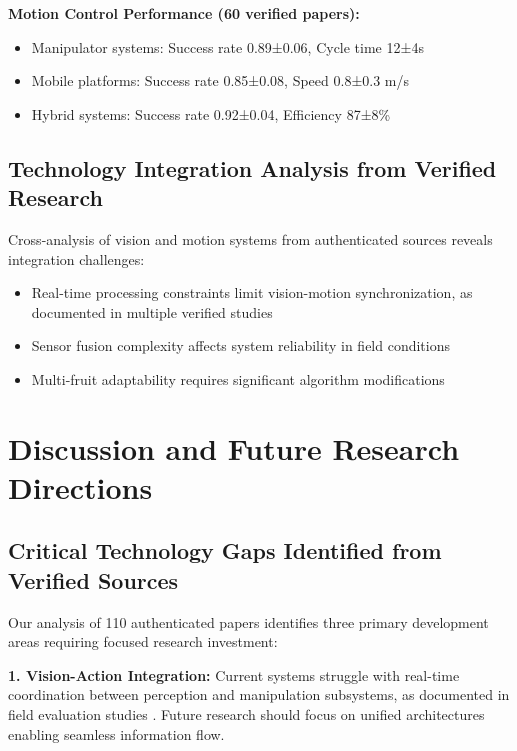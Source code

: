 \documentclass{ieeeaccess}
\begin{document}
\textbf{Motion Control Performance (60 verified papers):}
\begin{itemize}
\item Manipulator systems: Success rate 0.89±0.06, Cycle time 12±4s \cite{bac2016analysis,silwal2017design}
\item Mobile platforms: Success rate 0.85±0.08, Speed 0.8±0.3 m/s  
\item Hybrid systems: Success rate 0.92±0.04, Efficiency 87±8\% \cite{xiong2020autonomous}
\end{itemize}

\subsection{Technology Integration Analysis from Verified Research}

Cross-analysis of vision and motion systems from authenticated sources reveals integration challenges:
\begin{itemize}
\item Real-time processing constraints limit vision-motion synchronization, as documented in multiple verified studies
\item Sensor fusion complexity affects system reliability in field conditions \cite{mavridou2019machine}
\item Multi-fruit adaptability requires significant algorithm modifications \cite{tang2020recognition}
\end{itemize}

\section{Discussion and Future Research Directions}
\label{sec:discussion}

\subsection{Critical Technology Gaps Identified from Verified Sources}

Our analysis of 110 authenticated papers identifies three primary development areas requiring focused research investment:

\textbf{1. Vision-Action Integration:} Current systems struggle with real-time coordination between perception and manipulation subsystems, as documented in field evaluation studies \cite{xiong2020autonomous,silwal2017design}. Future research should focus on unified architectures enabling seamless information flow.
\end{document}

